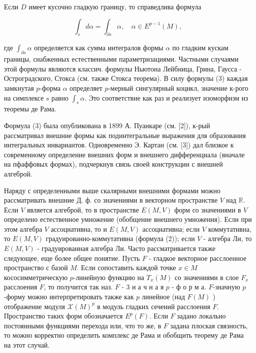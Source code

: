 \documentclass[10pt]{article}
\begin{document}
Если $D$ имеет кусочно гладкую границу, то справедлива формула



\[

\int_{s} d \alpha=\int_{\partial s} \alpha, \quad \alpha \in E^{p-1}(M),

\]



где $\int_{\partial s} \alpha$ определяется как сумма интегралов формы $\alpha$ по гладким кускам границы, снабженных естественными параметризациями. Частными случаями этой формулы являются классич. формулы Ньютона Лейбница, Грина, Гаусса - Остроградского, Стокса (см. также Стокса теорема). В силу формулы (3) каждая замкнутая $p$-форма $\alpha$ определяет $p$-мерный сингулярный коцикл, значение к-рого на симплексе $s$ равно $\int_{s} \alpha$. Это соответствие как раз и реализует изоморфизм из теоремы де Рама.



Формула (3) была опубликована в 1899 А. Пуанкаре (см. [2]), к-рый рассматривал внешние формы как подинтегральные выражения для образования интегральных инвариантов. Одновременно Э. Картан (см. [3]) дал близкое к современному определение внешних форм и внешнего дифференциала (вначале на пфаффовых формах), подчеркнув связь своей конструкции с внешней алгеброй.



Наряду с определенными выше скалярными внешними формами можно рассматривать внешние Д. ф. со значениями в векторном пространстве $V$ над $\mathbb{R}$. Если $V$ является алгеброй, то в пространстве $E(M, V)$ форм со значениями в $V$ определено естественное умножение (обобщение внешнего умножения). Если при этом алгебра $V$ ассоциативна, то и $E(M, V)$ ассоциативна; если $V$ коммутативна, то $E(M, V)$ градуированно-коммутативна (формула (2)); если $V$ - алгебра Ли, то $E(M, V)$ - градуированная алгебра Ли. Часто рассматривается также следующее, еще более общее понятие. Пусть $F$ - гладкое векторное расслоенное пространство с базой $M$. Если сопоставить каждой точке $x \in M$ кососимметрическую $p$-линейную функцию на $T_{x}(M)$ со значениями в слое $F_{x}$ расслоения $F$, то получится так наз. $F$ - 3 н а ч н а я $p$ - ф о р м а. $F$-значную $p$-форму можно интерпретировать также как $p$ линейное (над $F(M)$ ) отображение модуля $\mathscr{X}(M)^{p}$ в модуль гладких сечений расслоения $F$. Пространство таких форм обозначается $E^{p}(F)$. Если $F$ задано локально постоянными функциями перехода или, что то же, в $F$ задана плоская связность, то можно корректно определить комплекс де Рама и обобщить теорему де Рама на этот случай.
\end{document}
